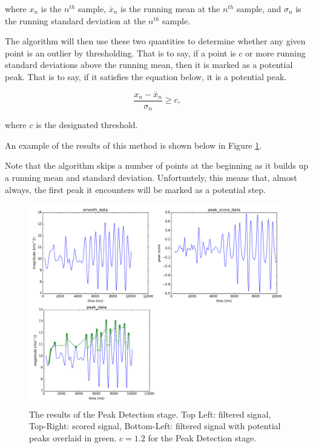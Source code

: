             where $x_n$ is the $n^{th}$ sample, $\bar{x}_n$ is the running mean at the $n^{th}$ sample, and $\sigma_n$ is the running standard deviation at the $n^{th}$ sample.

            The algorithm will then use these two quantities to determine whether any given point is an outlier by thresholding. That is to say, if a point is $c$ or more running standard deviations above the running mean, then it is marked as a potential peak. That is to say, if it satisfies the equation below, it is a potential peak.

            \begin{equation}
                \frac{x_n - \bar{x}_n}{\sigma_n}\geq c,
            \end{equation}

            where $c$ is the designated threshold.

            An example of the results of this method is shown below in Figure \ref{img_detection_stage}.

            Note that the algorithm skips a number of points at the beginning as it builds up a running mean and standard deviation. Unfortuntely, this means that, almost always, the first peak it encounters will be marked as a potential step.

            \begin{figure}[!th]
                \includegraphics[width=\textwidth]{Images/detection_stage.png}
                \centering
                \caption{The results of the Peak Detection stage. Top Left: filtered signal, Top-Right: scored signal, Bottom-Left: filtered signal with potential peaks overlaid in green. $c=1.2$ for the Peak Detection stage.}
                \label{img_detection_stage}
            \end{figure}

